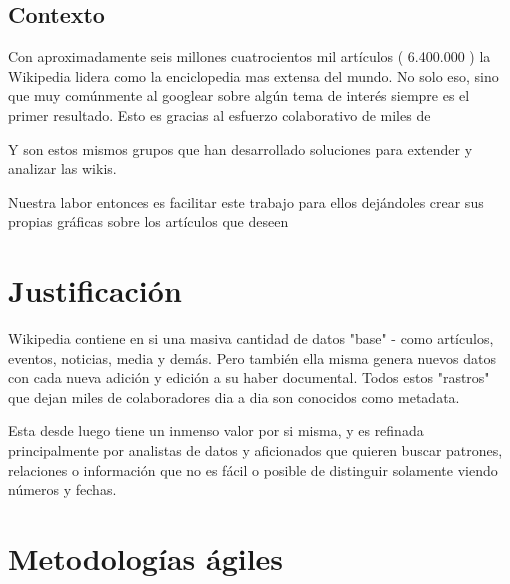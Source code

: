 \subsection{Contexto}



Con aproximadamente seis millones cuatrocientos mil artículos ( 6.400.000 ) la Wikipedia lidera como la enciclopedia mas extensa del mundo. No solo eso, sino que muy comúnmente al googlear sobre algún tema de interés siempre es el primer resultado.
Esto es gracias al esfuerzo colaborativo de miles de 





Y son estos mismos grupos que han desarrollado soluciones para extender y analizar las wikis.





Nuestra labor entonces es facilitar este trabajo para ellos dejándoles crear sus propias gráficas sobre los artículos que deseen

\section{Justificación}

Wikipedia contiene en si una masiva cantidad de datos "base" - como artículos, eventos, noticias, media y demás. Pero también ella misma genera nuevos datos con cada nueva adición y edición a su haber documental. Todos estos "rastros" que dejan miles de colaboradores dia a dia son conocidos como metadata.

Esta desde luego tiene un inmenso valor por si misma, y es refinada principalmente por analistas de datos y aficionados que quieren buscar patrones, relaciones o información que no es fácil o posible de distinguir solamente viendo números y fechas.



\section{Metodologías ágiles}

